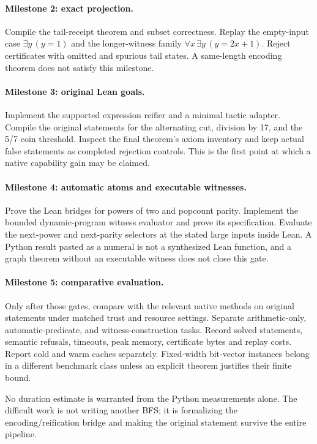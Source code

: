 \paragraph{Milestone 2: exact projection.}
Compile the tail-receipt theorem and subset correctness. Replay the empty-input case \(\exists y\,(y=1)\) and the longer-witness family \(\forall x\,\exists y\,(y=2x+1)\). Reject certificates with omitted and spurious tail states. A same-length encoding theorem does not satisfy this milestone.

\paragraph{Milestone 3: original Lean goals.}
Implement the supported expression reifier and a minimal tactic adapter. Compile the original statements for the alternating cut, division by 17, and the 5/7 coin threshold. Inspect the final theorem's axiom inventory and keep actual false statements as completed rejection controls. This is the first point at which a native capability gain may be claimed.

\paragraph{Milestone 4: automatic atoms and executable witnesses.}
Prove the Lean bridges for powers of two and popcount parity. Implement the bounded dynamic-program witness evaluator and prove its specification. Evaluate the next-power and next-parity selectors at the stated large inputs inside Lean. A Python result pasted as a numeral is not a synthesized Lean function, and a graph theorem without an executable witness does not close this gate.

\paragraph{Milestone 5: comparative evaluation.}
Only after those gates, compare with the relevant native methods on original statements under matched trust and resource settings. Separate arithmetic-only, automatic-predicate, and witness-construction tasks. Record solved statements, semantic refusals, timeouts, peak memory, certificate bytes and replay costs. Report cold and warm caches separately. Fixed-width bit-vector instances belong in a different benchmark class unless an explicit theorem justifies their finite bound.

No duration estimate is warranted from the Python measurements alone. The difficult work is not writing another BFS; it is formalizing the encoding/reification bridge and making the original statement survive the entire pipeline.

